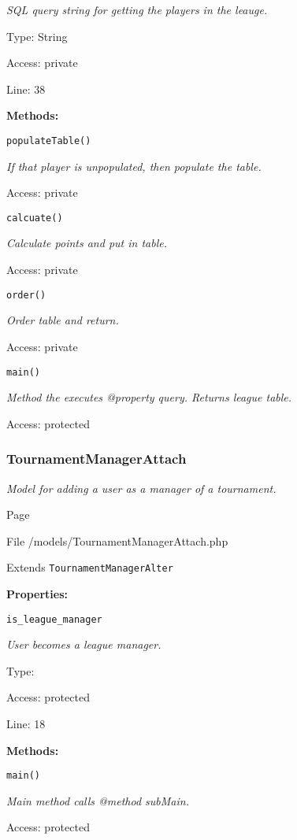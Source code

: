 {\scriptsize
\textit{SQL query string for getting the players in the leauge.}

Type: String

Access: private

Line: 38

}
\textbf{Methods:}

\texttt{populateTable()}

{\scriptsize
\textit{If that player is unpopulated, then populate the table.}

Access: private

}

\texttt{calcuate()}

{\scriptsize
\textit{Calculate points and put in table.}

Access: private

}

\texttt{order()}

{\scriptsize
\textit{Order table and return.}

Access: private

}

\texttt{main()}

{\scriptsize
\textit{Method the executes @property query.
Returns league table.}

Access: protected

}

\subsubsection{TournamentManagerAttach}
\textit{Model for adding a user as a manager of a tournament.}

Page \pageref{TournamentManagerAttach.php}

File /models/TournamentManagerAttach.php

Extends \texttt{TournamentManagerAlter}

\textbf{Properties:}

\texttt{is\_league\_manager}

{\scriptsize
\textit{User becomes a league manager.}

Type: 

Access: protected

Line: 18

}
\textbf{Methods:}

\texttt{main()}

{\scriptsize
\textit{Main method calls @method subMain.}

Access: protected

}

